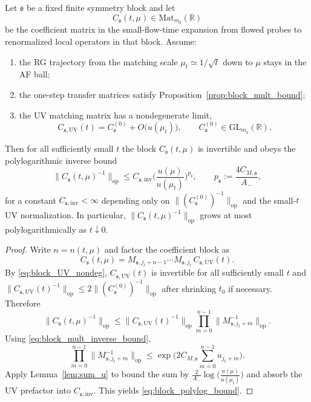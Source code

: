 \begin{theorem}\label{thm:block_polylog}
Let $\mathfrak s$ be a fixed finite symmetry block and let
\[
C_{\mathfrak s}(t,\mu)\in \mathrm{Mat}_{m_{\mathfrak s}}(\mathbb R)
\]
be the coefficient matrix in the small-flow-time expansion from flowed probes to renormalized local operators in that block.
Assume:
\begin{enumerate}[label=(\roman*),leftmargin=2.3em]
\item the RG trajectory from the matching scale $\mu_t\simeq 1/\sqrt t$ down to $\mu$ stays in the AF ball;
\item the one-step transfer matrices satisfy Proposition~\ref{prop:block_mult_bound};
\item the UV matching matrix has a nondegenerate limit,
\begin{equation}\label{eq:block_UV_nondeg}
C_{\mathfrak s,\mathrm{UV}}(t)=C_{\mathfrak s}^{(0)}+O\!\big(u(\mu_t)\big),
\qquad
C_{\mathfrak s}^{(0)}\in \mathrm{GL}_{m_{\mathfrak s}}(\mathbb R).
\end{equation}
\end{enumerate}
Then for all sufficiently small $t$ the block $C_{\mathfrak s}(t,\mu)$ is invertible and obeys the polylogarithmic inverse bound
\begin{equation}\label{eq:block_polylog_bound}
\|C_{\mathfrak s}(t,\mu)^{-1}\|_{\mathrm{op}}
\le
C_{\mathfrak s,\mathrm{inv}}
\Big(\frac{u(\mu)}{u(\mu_t)}\Big)^{p_{\mathfrak s}},
\qquad
p_{\mathfrak s}:=\frac{4C_{M,\mathfrak s}}{A_-},
\end{equation}
for a constant $C_{\mathfrak s,\mathrm{inv}}<\infty$ depending only on
$\|(C_{\mathfrak s}^{(0)})^{-1}\|_{\mathrm{op}}$ and the small-$t$ UV normalization.
In particular, $\|C_{\mathfrak s}(t,\mu)^{-1}\|_{\mathrm{op}}$ grows at most polylogarithmically as $t\downarrow 0$.
\end{theorem}

\begin{proof}
Write $n=n(t,\mu)$ and factor the coefficient block as
\[
C_{\mathfrak s}(t,\mu)
=
M_{\mathfrak s,j_t+n-1}\cdots M_{\mathfrak s,j_t}\,C_{\mathfrak s,\mathrm{UV}}(t).
\]
By \eqref{eq:block_UV_nondeg}, $C_{\mathfrak s,\mathrm{UV}}(t)$ is invertible for all sufficiently small $t$ and
$\|C_{\mathfrak s,\mathrm{UV}}(t)^{-1}\|_{\mathrm{op}}\le 2\|(C_{\mathfrak s}^{(0)})^{-1}\|_{\mathrm{op}}$ after shrinking $t_0$ if necessary.
Therefore
\[
\|C_{\mathfrak s}(t,\mu)^{-1}\|_{\mathrm{op}}
\le
\|C_{\mathfrak s,\mathrm{UV}}(t)^{-1}\|_{\mathrm{op}}
\prod_{m=0}^{n-1}\|M_{\mathfrak s,j_t+m}^{-1}\|_{\mathrm{op}}.
\]
Using \eqref{eq:block_mult_inverse_bound},
\[
\prod_{m=0}^{n-1}\|M_{\mathfrak s,j_t+m}^{-1}\|_{\mathrm{op}}
\le
\exp\!\Big(2C_{M,\mathfrak s}\sum_{m=0}^{n-1}u_{j_t+m}\Big).
\]
Apply Lemma~\ref{lem:sum_u} to bound the sum by
$\frac{2}{A_-}\log\!\big(\frac{u(\mu)}{u(\mu_t)}\big)$ and absorb the UV prefactor into
$C_{\mathfrak s,\mathrm{inv}}$.
This yields \eqref{eq:block_polylog_bound}.
\end{proof}

